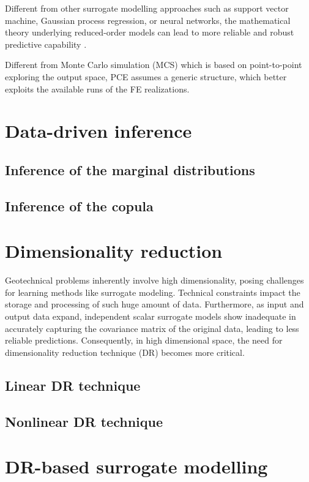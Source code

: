 Different from other surrogate modelling approaches such as support vector machine, Gaussian process regression, or neural networks, the mathematical theory underlying reduced-order models can lead to more reliable and robust predictive capability \citep{frangos2010,kapteyn2021}.

Different from Monte Carlo simulation (MCS) which is based on point-to-point exploring the output space, PCE assumes a generic structure, which better exploits the available runs of the FE realizations.

\section{Data-driven inference}
\subsection{Inference of the marginal distributions}
\subsection{Inference of the copula}
\section{Dimensionality reduction}


Geotechnical problems inherently involve high dimensionality, posing challenges for learning methods like surrogate modeling. Technical constraints impact the storage and processing of such huge amount of data. Furthermore, as input and output data expand, independent scalar surrogate models show inadequate in accurately capturing the covariance matrix of the original data, leading to less reliable predictions. Consequently, in high dimensional space, the need for dimensionality reduction technique (DR) becomes more critical. 


\subsection{Linear DR technique}

\subsection{Nonlinear DR technique}

\section{DR-based surrogate modelling}

